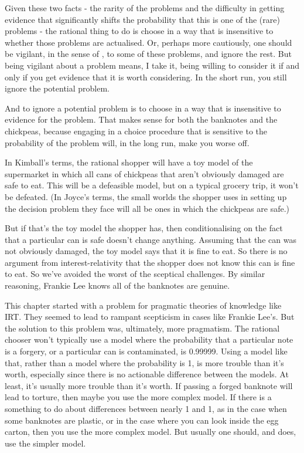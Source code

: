 \documentclass[
  11pt,
]{book}
\begin{document}
Given these two facts - the rarity of the problems and the difficulty in getting evidence that significantly shifts the probability that this is one of the (rare) problems - the rational thing to do is choose in a way that is insensitive to whether those problems are actualised. Or, perhaps more cautiously, one should be vigilant, in the sense of \citet{SperberEtAl2010}, to some of these problems, and ignore the rest. But being vigilant about a problem means, I take it, being willing to consider it if and only if you get evidence that it is worth considering. In the short run, you still ignore the potential problem.

And to ignore a potential problem is to choose in a way that is insensitive to evidence for the problem. That makes sense for both the banknotes and the chickpeas, because engaging in a choice procedure that is sensitive to the probability of the problem will, in the long run, make you worse off.

In Kimball's terms, the rational shopper will have a toy model of the supermarket in which all cans of chickpeas that aren't obviously damaged are safe to eat. This will be a defeasible model, but on a typical grocery trip, it won't be defeated. (In Joyce's terms, the small worlds the shopper uses in setting up the decision problem they face will all be ones in which the chickpeas are safe.)

But if that's the toy model the shopper has, then conditionalising on the fact that a particular can is safe doesn't change anything. Assuming that the can was not obviously damaged, the toy model says that it is fine to eat. So there is no argument from interest-relativity that the shopper does not know this can is fine to eat. So we've avoided the worst of the sceptical challenges. By similar reasoning, Frankie Lee knows all of the banknotes are genuine.

This chapter started with a problem for pragmatic theories of knowledge like IRT. They seemed to lead to rampant scepticism in cases like Frankie Lee's. But the solution to this problem was, ultimately, more pragmatism. The rational chooser won't typically use a model where the probability that a particular note is a forgery, or a particular can is contaminated, is 0.99999. Using a model like that, rather than a model where the probability is 1, is more trouble than it's worth, especially since there is no actionable difference between the models. At least, it's usually more trouble than it's worth. If passing a forged banknote will lead to torture, then maybe you use the more complex model. If there is a something to do about differences between nearly 1 and 1, as in the case when some banknotes are plastic, or in the case where you can look inside the egg carton, then you use the more complex model. But usually one should, and does, use the simpler model.
\end{document}
